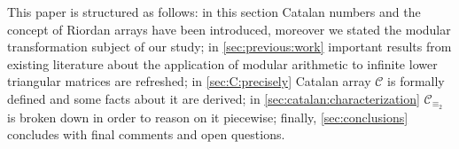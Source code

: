 

This paper is structured as follows: in this section 
Catalan numbers and the concept of Riordan arrays have been introduced, moreover we stated the modular
transformation subject of our study; in \autoref{sec:previous:work} important
results from existing literature about the application of modular
arithmetic to infinite lower triangular matrices are refreshed;
in \autoref{sec:C:precisely} Catalan array $\mathcal{C}$ is formally defined
and some facts about it are derived; 
in \autoref{sec:catalan:characterization} $\mathcal{C}_{\equiv_{2}}$ is broken down
in order to reason on it piecewise; finally, \autoref{sec:conclusions} concludes
with final comments and open questions.

